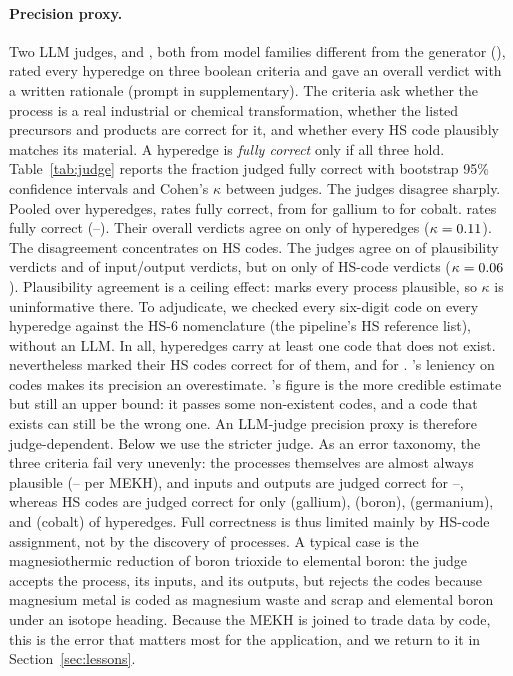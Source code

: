 \paragraph{Precision proxy.}
Two LLM judges, \JudgeAName{} and \JudgeBName{}, both from model families different from the generator (\GenModel{}), rated every hyperedge on three boolean criteria and gave an overall verdict with a written rationale (prompt in supplementary). The criteria ask whether the process is a real industrial or chemical transformation, whether the listed precursors and products are correct for it, and whether every HS code plausibly matches its material. A hyperedge is \emph{fully correct} only if all three hold. Table~\ref{tab:judge} reports the fraction judged fully correct with bootstrap 95\% confidence intervals and Cohen's $\kappa$ between judges. The judges disagree sharply. Pooled over \JudgeNAll{} hyperedges, \JudgeAName{} rates \JudgePrecisionAllClaude{} fully correct, from \JudgePrecisionGalliumClaude{} for gallium to \JudgePrecisionCobaltClaude{} for cobalt. \JudgeBName{} rates \JudgePrecisionAllLlama{} fully correct (\JudgePrecisionLlamaMin{}--\JudgePrecisionLlamaMax{}). Their overall verdicts agree on only \JudgeAgreementAll{} of hyperedges ($\kappa=0.11{}$). The disagreement concentrates on HS codes. The judges agree on \JudgeAgreePlausibleAll{} of plausibility verdicts and \JudgeAgreeIOAll{} of input/output verdicts, but on only \JudgeAgreeHSAll{} of HS-code verdicts ($\kappa=0.06{}$). Plausibility agreement is a ceiling effect: \JudgeBName{} marks every process plausible, so $\kappa$ is uninformative there. To adjudicate, we checked every six-digit code on every hyperedge against the HS-6 nomenclature (the pipeline's HS reference list), without an LLM. In all, \HsInvalidEdgesAll{} hyperedges carry at least one code that does not exist. \JudgeBName{} nevertheless marked their HS codes correct for \JudgeHsOnInvalidLlama{} of them, and \JudgeAName{} for \JudgeHsOnInvalidClaude{}. \JudgeBName{}'s leniency on codes makes its precision an overestimate. \JudgeAName{}'s figure is the more credible estimate but still an upper bound: it passes some non-existent codes, and a code that exists can still be the wrong one. An LLM-judge precision proxy is therefore judge-dependent. Below we use the stricter judge. As an error taxonomy, the three criteria fail very unevenly: the processes themselves are almost always plausible (\JudgePlausibleClaudeMin{}--\JudgePlausibleClaudeMax{} per MEKH), and inputs and outputs are judged correct for \JudgeIOClaudeMin{}--\JudgeIOClaudeMax{}, whereas HS codes are judged correct for only \JudgeHSGalliumClaude{} (gallium), \JudgeHSBoronClaude{} (boron), \JudgeHSGermaniumClaude{} (germanium), and \JudgeHSCobaltClaude{} (cobalt) of hyperedges. Full correctness is thus limited mainly by HS-code assignment, not by the discovery of processes. A typical case is the magnesiothermic reduction of boron trioxide to elemental boron: the judge accepts the process, its inputs, and its outputs, but rejects the codes because magnesium metal is coded as magnesium waste and scrap and elemental boron under an isotope heading. Because the MEKH is joined to trade data by code, this is the error that matters most for the application, and we return to it in Section~\ref{sec:lessons}.

